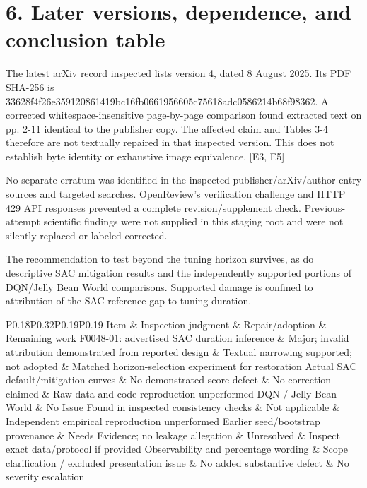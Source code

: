 \documentclass[10pt]{article}
\begin{document}
\section*{6. Later versions, dependence, and conclusion table}
The latest arXiv record inspected lists version 4, dated 8 August 2025. Its PDF SHA-256 is 33628f4f26e359120861419bc16fb0661956605c75618adc0586214b68f98362. A corrected whitespace-insensitive page-by-page comparison found extracted text on pp. 2-11 identical to the publisher copy. The affected claim and Tables 3-4 therefore are not textually repaired in that inspected version. This does not establish byte identity or exhaustive image equivalence. [E3, E5]\par
No separate erratum was identified in the inspected publisher/arXiv/author-entry sources and targeted searches. OpenReview’s verification challenge and HTTP 429 API responses prevented a complete revision/supplement check. Previous-attempt scientific findings were not supplied in this staging root and were not silently replaced or labeled corrected.\par
The recommendation to test beyond the tuning horizon survives, as do descriptive SAC mitigation results and the independently supported portions of DQN/Jelly Bean World comparisons. Supported damage is confined to attribution of the SAC reference gap to tuning duration.\par
P0.18P0.32P0.19P0.19 Item \& Inspection judgment \& Repair/adoption \& Remaining work
F0048-01: advertised SAC duration inference \& Major; invalid attribution demonstrated from reported design \& Textual narrowing supported; not adopted \& Matched horizon-selection experiment for restoration
Actual SAC default/mitigation curves \& No demonstrated score defect \& No correction claimed \& Raw-data and code reproduction unperformed
DQN / Jelly Bean World \& No Issue Found in inspected consistency checks \& Not applicable \& Independent empirical reproduction unperformed
Earlier seed/bootstrap provenance \& Needs Evidence; no leakage allegation \& Unresolved \& Inspect exact data/protocol if provided
Observability and percentage wording \& Scope clarification / excluded presentation issue \& No added substantive defect \& No severity escalation\par
\end{document}

